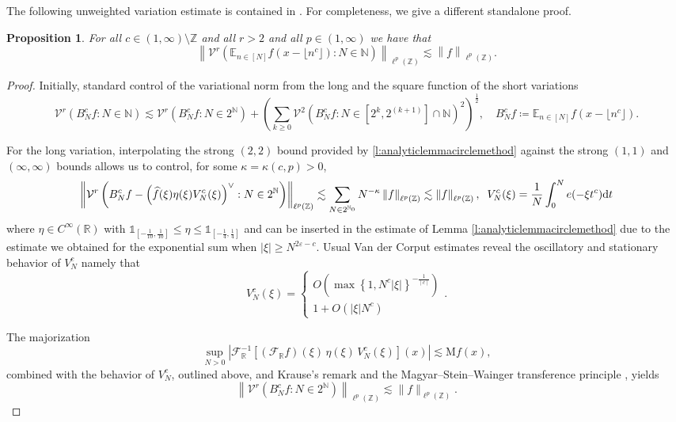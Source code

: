 \documentclass[10pt,leqno]{amsart}
\def\eps{\varepsilon}
\def\d{{\rm d}}
\def\R {\mathbb{R}}
\def\N {\mathbb{N}}
\def\Z {{\mathbb Z}}
\numberwithin{equation}{section}
\numberwithin{counter2}{section}
\newtheorem{proposition}[subsection]{Proposition}
\theoremstyle{definition}
\theoremstyle{plain}
\newcommand{\ind}[1]{\mathds{1}_{{#1}}}
\newcommand{\floor}[1]{\lfloor #1 \rfloor}
\newcommand{\ceiling}[1]{\left\lceil #1 \right\rceil}
\newcommand{\EE}{\mathbb{E}}
\begin{document}
	The following unweighted variation estimate is contained in \cite[Corollary~1.6]{OKeeffe2024}. For completeness, we give a different standalone proof.
	\begin{proposition} \label{p:ncvar} For all $c \in (1,\infty) \setminus \Z$ and all $r>2$ and all $ p \in (1,\infty)$ we have that 
		\[  \left \| \mathcal{V}^r( \EE_{n \in [N]}f(x-\floor{n^c}) : N \in \N ) \right \|_{\ell^p(\Z)}  \lesssim \left \| f \right \|_{\ell^p(\Z)}. \] 
	\end{proposition}
	\begin{proof}
		Initially, standard control of the variational norm from the  long and the square function of the short variations \[ \mathcal{V}^r \left(B_N^{c} f: N \in \N\right) \lesssim \mathcal{V}^r\left(B_{N}^{c} f:N \in 2^{\N}  \right)+\left(\sum_{k \geq0} \mathcal{V}^2\left (B_N^{c} f:N \in [2^{k},2^{(k+1)}]\cap\N\right )^2\right)^{\frac{1}{2}}, \quad B_N^{c} f \coloneqq \EE_{n \in [N]}f(x-\floor{n^c}).\] 
        
        For the long variation, interpolating the strong $(2,2)$ bound provided by \ref{l:analyticlemmacirclemethod} against the strong $(1,1)$ and $(\infty,\infty)$ bounds allows us to control, for some $\kappa=\kappa(c,p)>0$, \[ \left \| \mathcal{V}^r \left( B_{N}^{c} f-\left(\widehat{f}(\xi) \eta(\xi) V_{N}^c(\xi)\right)^{\vee}: N \in 2^{\N}  \right) \right \|_{\ell^p(\Z)} \lesssim \sum_{N \in 2^{\N_0}} N^{-\kappa} \left \| f \right \|_{\ell^p(\Z)} \lesssim \left \| f \right \|_{\ell^p(\Z)}, \; \; V_N^c(\xi)= \frac{1}{N} \int_{0}^Ne(-\xi t^c ) \d t    \] where $\eta  \in C^{\infty}(\R)$ with $\ind{\left[-\frac{1}{10},\frac{1}{10}\right]} \leq \eta \leq \ind{\left[-\frac{1}{4},\frac{1}{4}\right]}$ and can be inserted in the estimate of Lemma \ref{l:analyticlemmacirclemethod} due to the estimate we obtained for the exponential sum when $|\xi| \geq N^{2\eps-c}.$ Usual Van der Corput estimates reveal the oscillatory and stationary behavior of $V_N^c$ namely that \begin{equation} \label{eq:vnestimates}
			V_N^c(\xi)= \begin{cases}
				O\left( \max\left\{1,N^c |\xi| \right\} ^{-\frac{1}{\ceiling{c}}}\right) \\ 1+O(|\xi|N^c)
			\end{cases}.
		\end{equation}
      
        
        The majorization
        \[
        \sup_{N>0}
        \left|\mathcal{F}_{\R}^{-1}
        \left[(\mathcal{F}_{\R}f)(\xi)\,\eta(\xi)\,V_N^c(\xi)\right](x)\right|
        \lesssim \mathrm{M}f(x),
        \]
       combined with the behavior of $V_N^c$, outlined above,  and Krause's remark \cite[Remark 3.134]{KrauseBook} and the
        Magyar--Stein--Wainger transference principle \cite[Proposition 2.1]{MSW02}, yields
       \[
        \left\|\mathcal{V}^r\left(B_N^{c} f:N\in 2^{\N} \right)\right\|_{\ell^p(\Z)}
        \lesssim \|f\|_{\ell^p(\Z)}.
        \]
   

\end{proof}
\end{document}
